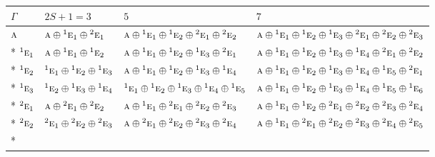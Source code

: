 \documentclass[10pt,a4paper]{article}
\numberwithin{equation}{section}
\newcommand{\irr}[1]{\text{\normalfont\scshape #1}}
\newcommand{\conjpair}[1]{{}^{#1}}
\begin{document}
{\small\setlength{\tabcolsep}{3pt}\begin{longtable}{@{}llll@{}}\toprule
$\Gamma$ & $2S + 1 = 3$ & $5$ & $7$\\\midrule\endhead
\bottomrule\endfoot\endlastfoot
$\irr{a}$ & $\irr{a}\oplus \conjpair{1}\irr{e}_{1}\oplus \conjpair{2}\irr{e}_{1}$ & $\irr{a}\oplus \conjpair{1}\irr{e}_{1}\oplus \conjpair{1}\irr{e}_{2}\oplus \conjpair{2}\irr{e}_{1}\oplus \conjpair{2}\irr{e}_{2}$ & $\irr{a}\oplus \conjpair{1}\irr{e}_{1}\oplus \conjpair{1}\irr{e}_{2}\oplus \conjpair{1}\irr{e}_{3}\oplus \conjpair{2}\irr{e}_{1}\oplus \conjpair{2}\irr{e}_{2}\oplus \conjpair{2}\irr{e}_{3}$\\*
$\conjpair{1}\irr{e}_{1}$ & $\irr{a}\oplus \conjpair{1}\irr{e}_{1}\oplus \conjpair{1}\irr{e}_{2}$ & $\irr{a}\oplus \conjpair{1}\irr{e}_{1}\oplus \conjpair{1}\irr{e}_{2}\oplus \conjpair{1}\irr{e}_{3}\oplus \conjpair{2}\irr{e}_{1}$ & $\irr{a}\oplus \conjpair{1}\irr{e}_{1}\oplus \conjpair{1}\irr{e}_{2}\oplus \conjpair{1}\irr{e}_{3}\oplus \conjpair{1}\irr{e}_{4}\oplus \conjpair{2}\irr{e}_{1}\oplus \conjpair{2}\irr{e}_{2}$\\*
$\conjpair{1}\irr{e}_{2}$ & $\conjpair{1}\irr{e}_{1}\oplus \conjpair{1}\irr{e}_{2}\oplus \conjpair{1}\irr{e}_{3}$ & $\irr{a}\oplus \conjpair{1}\irr{e}_{1}\oplus \conjpair{1}\irr{e}_{2}\oplus \conjpair{1}\irr{e}_{3}\oplus \conjpair{1}\irr{e}_{4}$ & $\irr{a}\oplus \conjpair{1}\irr{e}_{1}\oplus \conjpair{1}\irr{e}_{2}\oplus \conjpair{1}\irr{e}_{3}\oplus \conjpair{1}\irr{e}_{4}\oplus \conjpair{1}\irr{e}_{5}\oplus \conjpair{2}\irr{e}_{1}$\\*
$\conjpair{1}\irr{e}_{3}$ & $\conjpair{1}\irr{e}_{2}\oplus \conjpair{1}\irr{e}_{3}\oplus \conjpair{1}\irr{e}_{4}$ & $\conjpair{1}\irr{e}_{1}\oplus \conjpair{1}\irr{e}_{2}\oplus \conjpair{1}\irr{e}_{3}\oplus \conjpair{1}\irr{e}_{4}\oplus \conjpair{1}\irr{e}_{5}$ & $\irr{a}\oplus \conjpair{1}\irr{e}_{1}\oplus \conjpair{1}\irr{e}_{2}\oplus \conjpair{1}\irr{e}_{3}\oplus \conjpair{1}\irr{e}_{4}\oplus \conjpair{1}\irr{e}_{5}\oplus \conjpair{1}\irr{e}_{6}$\\*
$\conjpair{2}\irr{e}_{1}$ & $\irr{a}\oplus \conjpair{2}\irr{e}_{1}\oplus \conjpair{2}\irr{e}_{2}$ & $\irr{a}\oplus \conjpair{1}\irr{e}_{1}\oplus \conjpair{2}\irr{e}_{1}\oplus \conjpair{2}\irr{e}_{2}\oplus \conjpair{2}\irr{e}_{3}$ & $\irr{a}\oplus \conjpair{1}\irr{e}_{1}\oplus \conjpair{1}\irr{e}_{2}\oplus \conjpair{2}\irr{e}_{1}\oplus \conjpair{2}\irr{e}_{2}\oplus \conjpair{2}\irr{e}_{3}\oplus \conjpair{2}\irr{e}_{4}$\\*
$\conjpair{2}\irr{e}_{2}$ & $\conjpair{2}\irr{e}_{1}\oplus \conjpair{2}\irr{e}_{2}\oplus \conjpair{2}\irr{e}_{3}$ & $\irr{a}\oplus \conjpair{2}\irr{e}_{1}\oplus \conjpair{2}\irr{e}_{2}\oplus \conjpair{2}\irr{e}_{3}\oplus \conjpair{2}\irr{e}_{4}$ & $\irr{a}\oplus \conjpair{1}\irr{e}_{1}\oplus \conjpair{2}\irr{e}_{1}\oplus \conjpair{2}\irr{e}_{2}\oplus \conjpair{2}\irr{e}_{3}\oplus \conjpair{2}\irr{e}_{4}\oplus \conjpair{2}\irr{e}_{5}$\\*

\end{longtable}}
\end{document}
